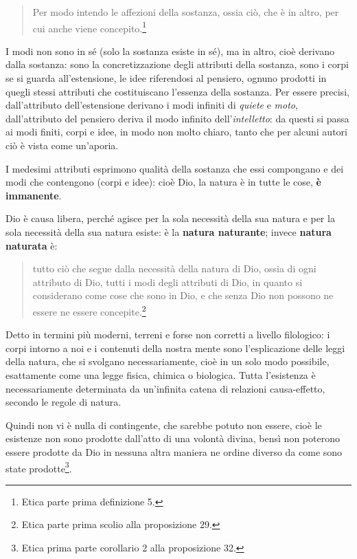 \begin{quotation}
	\small Per modo intendo le affezioni della sostanza, ossia ciò, che è in altro, per cui anche viene concepito.\footnote{Etica parte prima definizione 5.}
\end{quotation}

I modi non sono in sé (solo la sostanza esiste in sé), ma in altro, cioè derivano dalla sostanza: sono la concretizzazione degli attributi della sostanza, sono i corpi se si guarda all'estensione, le idee riferendosi al pensiero, ognuno prodotti in quegli stessi attributi che costituiscano l'essenza della sostanza. Per essere precisi, dall'attributo dell'estensione derivano i modi infiniti di \textit{quiete} e \textit{moto}, dall'attributo del pensiero deriva il modo infinito dell'\textit{intelletto}: da questi si passa ai modi finiti, corpi e idee, in modo non molto chiaro, tanto che per alcuni autori ciò è vista come un'aporia.

I medesimi attributi esprimono qualità della sostanza che essi compongano e dei modi che contengono (corpi e idee): cioè Dio, la natura è in tutte le cose, \textbf{è immanente}.

Dio è causa libera, perché agisce per la sola necessità della sua natura e per la sola necessità della sua natura esiste: è la \textbf{natura naturante}; invece \textbf{natura naturata} è:
\begin{quotation}
	\small tutto ciò che segue dalla necessità della natura di Dio, ossia di ogni attributo di Dio, tutti i modi degli attributi di Dio, in quanto si considerano come cose che sono in Dio, e che senza Dio non possono ne essere ne essere concepite.\footnote{Etica parte prima scolio alla proposizione 29.}
\end{quotation}

Detto in termini più moderni, terreni e forse non corretti a livello filologico: i corpi intorno a noi e i contenuti della nostra mente sono l'esplicazione  delle leggi della natura, che si svolgano necessariamente, cioè in un solo modo possibile, esattamente come una legge fisica, chimica o biologica. Tutta l'esistenza è necessariamente determinata da un'infinita catena di relazioni causa-effetto, secondo le regole di natura. 

Quindi non vi è nulla di contingente, che sarebbe potuto non essere, cioè le esistenze non sono prodotte dall'atto di una volontà divina, bensì non poterono essere prodotte da Dio in nessuna altra maniera ne ordine diverso da come sono state prodotte\footnote{Etica prima parte corollario 2 alla proposizione 32.}.


